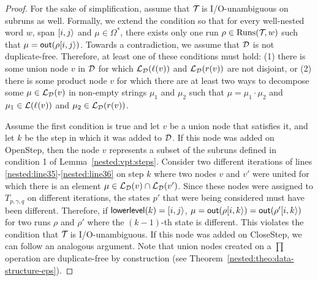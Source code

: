 \begin{proof}
	For the sake of simplification, assume that $\mathcal{T}\!$ is I/O-unambiguous on subruns as well. Formally, we extend the condition so that for every well-nested word $w$, span $[i,j\rangle$ and $\mu\in\Omega^*$, there exists only one run $\rho\in\operatorname{Runs}(\mathcal{T}\!,w)$ such that $\mu = \textsf{out}(\rho[i,j\rangle)$.
	Towards a contradiction, we assume that $\mathcal{D}$ is not duplicate-free. Therefore, at least one of these conditions must hold: (1) there is some union node $v$ in $\mathcal{D}$ for which $\mathcal{L}_{\mathcal{D}}(\ell(v))$ and $\mathcal{L}_{\mathcal{D}}(r(v))$ are not disjoint, or (2) there is some product node $v$ for which there are at least two ways to decompose some $\mu\in\mathcal{L}_{\mathcal{D}}(v)$ in non-empty strings $\mu_1$ and $\mu_2$ such that $\mu = \mu_1\cdot\mu_2$ and $\mu_1\in\mathcal{L}(\ell(v))$ and $\mu_2\in\mathcal{L}_{\mathcal{D}}(r(v))$. 
	
	Assume the first condition is true and let $v$ be a union node that satisfies it, and let $k$ be the step in which it was added to $\mathcal{D}$. If this node was added on {\sc OpenStep}, then the node $v$ represents a subset of the subruns defined in condition 1 of Lemma~\ref{nested:vpt:steps}. Consider two different iterations of lines \ref{nested:line35}-\ref{nested:line36} on step $k$ where two nodes $v$ and $v'$ were united for which there is an element $\mu\in\mathcal{L}_{\mathcal{D}}(v)\cap\mathcal{L}_{\mathcal{D}}(v')$. Since these nodes were assigned to $T_{p,\gamma,q}$ on different iterations, the states $p'$ that were being considered must have been different. Therefore, if ${\sf lowerlevel}(k) = [i,j\rangle$, $\mu = \textsf{out}(\rho[i,k\rangle) = \textsf{out}(\rho'[i,k\rangle)$ for two runs $\rho$ and $\rho'$ where the $(k-1)$-th state is different. This violates the condition that $\mathcal{T}\!$ is I/O-unambiguous. If this node was added on {\sc CloseStep}, we can follow an analogous argument. Note that union nodes created on a $\prod$ operation are duplicate-free by construction (see Theorem~\ref{nested:theo:data-structure-eps}).
	

\end{proof}
